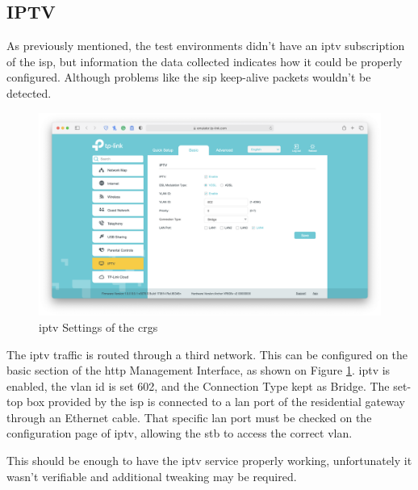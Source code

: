 \subsection{IPTV}

As previously mentioned, the test environments didn’t have an \gls{iptv} subscription of the \gls{isp}, but information the data collected indicates how it could be properly configured. Although problems like the \gls{sip} keep-alive packets wouldn’t be detected.

\begin{figure}[h]
    \centering
    \includegraphics[width=\linewidth]{contents/substituting-the-isp-cpe/iptv/basic-iptv.png}
    \caption{\gls{iptv} Settings of the \gls{crg}s}
    \label{figure:crgs_iptv}
\end{figure}

The \gls{iptv} traffic is routed through a third network. This can be configured on the basic section of the \gls{http} Management Interface, as shown on Figure \ref{figure:crgs_iptv}. \gls{iptv} is enabled, the \gls{vlan} \gls{id} is set 602, and the Connection Type kept as Bridge. The set-top box provided by the \gls{isp} is connected to a \gls{lan} port of the residential gateway through an Ethernet cable. That specific \gls{lan} port must be checked on the configuration page of \gls{iptv}, allowing the \gls{stb} to access the correct \gls{vlan}.

This should be enough to have the \gls{iptv} service properly working, unfortunately it wasn’t verifiable and additional tweaking may be required.

\FloatBarrier
